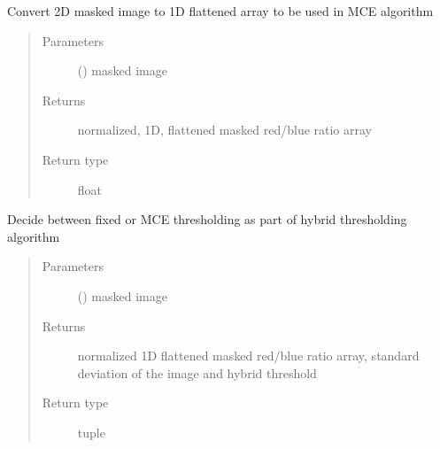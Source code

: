 \documentclass[letterpaper,10pt,english]{sphinxmanual}
\begin{document}

\begin{fulllineitems}
\label{\detokenize{thresholds:thresholds.flatten_clean_array}}
Convert 2D masked image to 1D flattened array to be used in MCE algorithm
\begin{quote}\begin{description}
\item[{Parameters}] \leavevmode
{} () \textendash{} masked image

\item[{Returns}] \leavevmode
normalized, 1D, flattened masked red/blue ratio array

\item[{Return type}] \leavevmode
float

\end{description}\end{quote}

\end{fulllineitems}


\begin{fulllineitems}
\label{\detokenize{thresholds:thresholds.hybrid}}
Decide between fixed or MCE thresholding as part of hybrid thresholding algorithm
\begin{quote}\begin{description}
\item[{Parameters}] \leavevmode
{} () \textendash{} masked image

\item[{Returns}] \leavevmode
normalized 1D flattened masked red/blue ratio array, standard deviation of the image and hybrid threshold

\item[{Return type}] \leavevmode
tuple

\end{description}\end{quote}

\end{fulllineitems}
\end{document}
